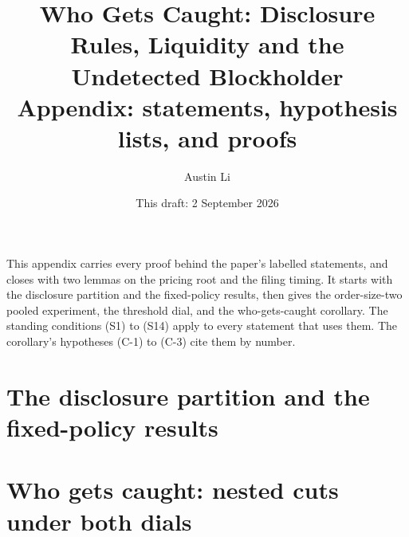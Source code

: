 \documentclass[11pt]{article}
\title{\textbf{Who Gets Caught: Disclosure Rules, Liquidity and the Undetected Blockholder}\\[0.3em]
\large Appendix: statements, hypothesis lists, and proofs}
\author{Austin Li\\[0.25em]}
\date{This draft: 2 September 2026}
\begin{document}
\maketitle

\noindent This appendix carries every proof behind the paper's labelled
statements, and closes with two lemmas on the pricing root and the filing timing.
It starts with the disclosure partition and the fixed-policy results,
then gives the order-size-two pooled experiment, the threshold dial, and the
who-gets-caught corollary. The standing conditions (S1) to (S14) apply to
every statement that uses them. The corollary's hypotheses (C-1) to (C-3) cite
them by number.

\section{The disclosure partition and the fixed-policy results}
\label{sec:app-partition}









\section{Who gets caught: nested cuts under both dials}
\label{sec:app-caught}






\end{document}
